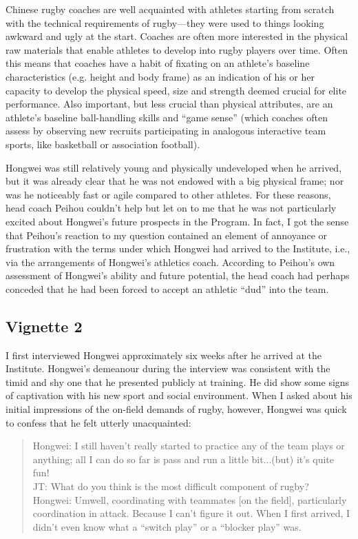 Chinese rugby coaches are well acquainted with athletes starting from scratch with the technical requirements of rugby---they were used to things looking awkward and ugly at the start. Coaches are often more interested in the physical raw materials that enable athletes to develop into rugby players over time.  Often this means that coaches have a habit of fixating on an athlete's baseline characteristics (e.g. height and body frame) as an indication of his or her capacity to develop the physical speed, size and strength deemed crucial for elite performance.  Also important, but less crucial than physical attributes, are an athlete’s baseline ball-handling skills and ``game sense'' (which coaches often assess by observing new recruits participating in analogous interactive team sports, like basketball or association football).

Hongwei was still relatively young and physically undeveloped when he arrived, but it was already clear that he was not endowed with a big physical frame; nor was he noticeably fast or agile compared to other athletes.  For these reasons, head coach Peihou couldn’t help but let on to me that he was not particularly excited about Hongwei's future prospects in the Program.  In fact, I got the sense that Peihou's reaction to my question contained an element of annoyance or frustration with the terms under which Hongwei had arrived to the Institute, i.e., via the arrangements of Hongwei’s athletics coach.  According to Peihou's own assessment of Hongwei's ability and future potential, the head coach had perhaps conceded that he had been forced to accept an athletic ``dud'' into the team.

\subsection{Vignette 2}
I first interviewed Hongwei approximately six weeks after he arrived at the Institute.   Hongwei's demeanour during the interview was consistent with the timid and shy one that he presented publicly at training. He did show some signs of captivation with his new sport and social environment.  When I asked about his initial impressions of the on-field demands of rugby, however, Hongwei was quick to confess that he felt utterly unacquainted:

\begin{quotation}
  Hongwei: I still haven’t really started to practice any of the team plays or anything; all I can do so far is pass and run a little bit...(but) it's quite fun! \\
  JT: What do you think is the most difficult component of rugby? \\
  Hongwei: Um\textellipsis well, coordinating with teammates [on the field], particularly coordination in attack.  Because I can't figure it out. When I first arrived, I didn’t even know what a ``switch play'' or a ``blocker play'' was.
\end{quotation}

